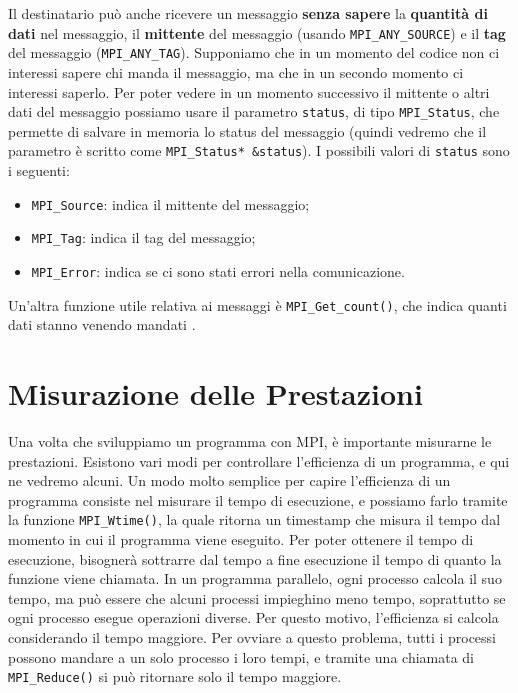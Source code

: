 Il destinatario può anche ricevere un messaggio \textbf{senza sapere} la \textbf{quantità di dati} nel messaggio, il \textbf{mittente} del messaggio (usando \verb|MPI_ANY_SOURCE|) e il \textbf{tag} del messaggio (\verb|MPI_ANY_TAG|).
\nwl
Supponiamo che in un momento del codice non ci interessi sapere chi manda il messaggio, ma che in un secondo momento ci interessi saperlo. Per poter vedere in un momento successivo il mittente o altri dati del messaggio possiamo usare il parametro \verb|status|, di tipo \verb|MPI_Status|, che permette di salvare in memoria lo status del messaggio (quindi vedremo che il parametro è scritto come \verb|MPI_Status* &status|). I possibili valori di \verb|status| sono i seguenti:
\begin{itemize}
    \item \verb|MPI_Source|: indica il mittente del messaggio;
    \item \verb|MPI_Tag|: indica il tag del messaggio;
    \item \verb|MPI_Error|: indica se ci sono stati errori nella comunicazione.
\end{itemize}

Un'altra funzione utile relativa ai messaggi è \verb|MPI_Get_count()|, che indica quanti dati stanno venendo mandati .


\section{Misurazione delle Prestazioni}

Una volta che sviluppiamo un programma con MPI, è importante misurarne le prestazioni. Esistono vari modi per controllare l'efficienza di un programma, e qui ne vedremo alcuni.
\nwl
Un modo molto semplice per capire l'efficienza di un programma consiste nel misurare il tempo di esecuzione, e possiamo farlo tramite la funzione \verb|MPI_Wtime()|, la quale ritorna un timestamp che misura il tempo dal momento in cui il programma viene eseguito. Per poter ottenere il tempo di esecuzione, bisognerà sottrarre dal tempo a fine esecuzione il tempo di quanto la funzione viene chiamata.
\nwl
In un programma parallelo, ogni processo calcola il suo tempo, ma può essere che alcuni processi impieghino meno tempo, soprattutto se ogni processo esegue operazioni diverse. Per questo motivo, l'efficienza si calcola considerando il tempo maggiore. Per ovviare a questo problema, tutti i processi possono mandare a un solo processo i loro tempi, e tramite una chiamata di \verb|MPI_Reduce()| si può ritornare solo il tempo maggiore.

